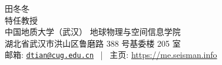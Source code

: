 \documentclass[11pt, a4paper]{article}
\makeatletter
\newcommand{\MyName}{田冬冬}
\newcommand{\MyRole}{特任教授}
\newcommand{\Email}{dtian@cug.edu.cn}
\newcommand{\Website}{https://me.seisman.info}
\newcommand{\Affiliation}{中国地质大学（武汉）\hspace{1ex} 地球物理与空间信息学院}
\newcommand{\Address}{湖北省武汉市洪山区鲁磨路 388 号基委楼 205 室}
\newcommand{\makefield}[2]{\makebox[1.5em]{\color{MarkerColour!80!black}#1} #2}
\makeatother
\begin{document}
\thispagestyle{empty}

\begin{center}
    \kaishu
    {\fontsize{28pt}{0}\selectfont \MyName}
    \\[0.5cm]
    {\fontsize{17pt}{0}\selectfont \MyRole}
    \\[0.3cm]
    {\fontsize{13pt}{0}\selectfont
        \Affiliation
        \\[0.2cm]
        \Address
        \\[0.08cm]
        邮箱: \href{mailto:\Email}{\texttt{\Email}}
        \, | \,
        主页: \url{\Website}
    }
\end{center}












\end{document}
